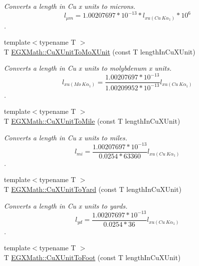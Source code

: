 \begin{DoxyCompactItemize}
\begin{DoxyCompactList}\small\item\em Converts a length in Cu x units to microns. \[ l_{\mu m}=1.00207697*10^{-13} * l_{xu(Cu\ K\alpha_1)} * 10^{6} \]. \end{DoxyCompactList}\item 
{\footnotesize template$<$typename T $>$ }\\T \mbox{\hyperlink{group___e_g_x_math-_conversions-_length_conversions-_non-_s_i-_cu_x_unit-_non-_s_i_gad93f4b59cc8e8f052b3cf8cad7c7b173}{E\+G\+X\+Math\+::\+Cu\+X\+Unit\+To\+Mo\+X\+Unit}} (const T length\+In\+Cu\+X\+Unit)
\begin{DoxyCompactList}\small\item\em Converts a length in Cu x units to molybdenum x units. \[ l_{xu(Mo\ K\alpha_1)}=\frac{1.00207697*10^{-13}}{1.00209952*10^{-13}} l_{xu(Cu\ K\alpha_1)}\]. \end{DoxyCompactList}\item 
{\footnotesize template$<$typename T $>$ }\\T \mbox{\hyperlink{group___e_g_x_math-_conversions-_length_conversions-_non-_s_i-_cu_x_unit-_imperial_gaa1fe76010dc4559641c3bd31bd0f2c3e}{E\+G\+X\+Math\+::\+Cu\+X\+Unit\+To\+Mile}} (const T length\+In\+Cu\+X\+Unit)
\begin{DoxyCompactList}\small\item\em Converts a length in Cu x units to miles. \[ l_{mi}=\frac{1.00207697*10^{-13}}{0.0254 * 63360} l_{xu(Cu\ K\alpha_1)} \]. \end{DoxyCompactList}\item 
{\footnotesize template$<$typename T $>$ }\\T \mbox{\hyperlink{group___e_g_x_math-_conversions-_length_conversions-_non-_s_i-_cu_x_unit-_imperial_ga9f1d992d0b4ec16bf1d10bd0b0d96f96}{E\+G\+X\+Math\+::\+Cu\+X\+Unit\+To\+Yard}} (const T length\+In\+Cu\+X\+Unit)
\begin{DoxyCompactList}\small\item\em Converts a length in Cu x units to yards. \[ l_{yd}= \frac{1.00207697*10^{-13}}{0.0254 * 36} l_{xu(Cu\ K\alpha_1)} \]. \end{DoxyCompactList}\item 
{\footnotesize template$<$typename T $>$ }\\T \mbox{\hyperlink{group___e_g_x_math-_conversions-_length_conversions-_non-_s_i-_cu_x_unit-_imperial_ga715aad2504073f62b0afd0e492d97f2a}{E\+G\+X\+Math\+::\+Cu\+X\+Unit\+To\+Foot}} (const T length\+In\+Cu\+X\+Unit)

\end{DoxyCompactItemize}
